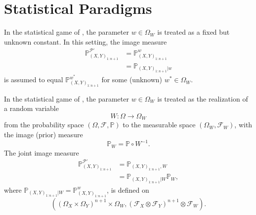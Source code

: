 \chapter{Statistical Paradigms}
\label{chp:statistical_paradigms}
\begin{axiom}
	\label{ax:parameter_fixed}
	In the statistical game of , the parameter $w \in \Omega_W$ is treated as a fixed but unknown constant. In this setting, the image measure 
	\begin{equation}
		\begin{split}
			\mathbb{P}_{(X,Y)_{1\colon n+1}}^{\mathcal{P}'} &= \mathbb{P}_{(X,Y)_{1:n+1}}^w\\
			& =  \mathbb{P}_{(X,Y)_{1:n+1}|w}
		\end{split}
	\end{equation}
	is assumed to equal $\mathbb{P}_{(X,Y)_{1:n+1}}^{w^*}$ for some (unknown) $w^* \in \Omega_W$.
\end{axiom}

\begin{axiom}
	\label{ax:parameter_variable}
	In the statistical game of , the parameter $w \in \Omega_W$ is treated as the realization of a random variable
	\begin{equation}
		W\colon\Omega \to \Omega_W
	\end{equation}
	from the probability space $(\Omega, \mathcal{F}, \mathbb{P})$ to the measurable space $(\Omega_W, \mathcal{F}_W)$, with the image (prior) measure
	\begin{equation}
		\mathbb{P}_{W} = \mathbb{P} \circ W^{-1}.
	\end{equation}
	The joint image measure 
	\begin{equation}
		\begin{split}
			\mathbb{P}_{(X,Y)_{1\colon n+1}}^{\mathcal{P}'} & = \mathbb{P}_{(X,Y)_{1:n+1},W} \\
			&= \mathbb{P}_{(X,Y)_{1:n+1}|W}\mathbb{P}_{W},
		\end{split}
	\end{equation}
	where $\mathbb{P}_{(X,Y)_{1:n+1}|W}=\mathbb{P}_{(X,Y)_{1:n+1}}^w$, is defined on 
	\begin{equation}
		((\Omega_X \times \Omega_Y)^{n+1}\times \Omega_W, (\mathcal{F}_X \otimes \mathcal{F}_Y)^{n+1}\otimes \mathcal{F}_W ).
	\end{equation}
\end{axiom}

